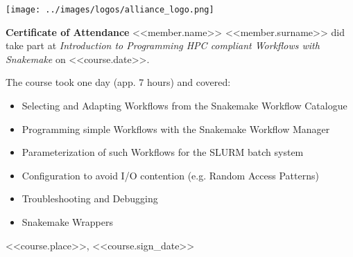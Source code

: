 \documentclass[a4paper,10pt]{article}
\begin{document}
\pagestyle{empty}
\begin{multicols}{2}
 \begin{minipage}{\textwidth}
  \texttt{[image: ../images/logos/alliance\_logo.png]}
 \end{minipage}

 \columnbreak
\end{multicols}


\begin{center}
 \vfill
 \huge{\bf Certificate of Attendance}
 \vfill
 \Large{<<member.name>> <<member.surname>>}
 \vfill
 did take part at 
 \vfill
 \emph{Introduction to Programming HPC compliant Workflows with Snakemake}
 \vfill
 on <<course.date>>.
 \vfill
\end{center}

The course took one day (app. 7 hours) and covered:
\begin{itemize}
  \item Selecting and Adapting Workflows from the Snakemake Workflow Catalogue
  \item Programming simple Workflows with the Snakemake Workflow Manager
  \item Parameterization of such Workflows for the SLURM batch system
  \item Configuration to avoid I/O contention (e.g. Random Access Patterns)
  \item Troubleshooting and Debugging
  \item Snakemake Wrappers
\end{itemize}

\vfill
<<course.place>>, <<course.sign_date>>
\end{document}
